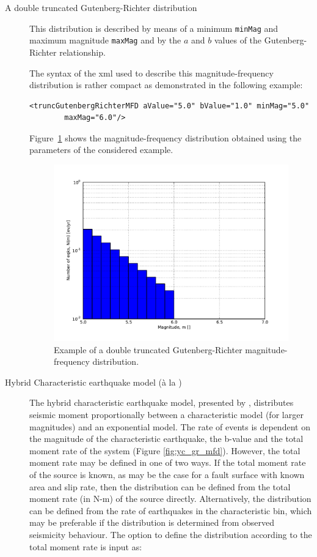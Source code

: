 \begin{description}
\item[A double truncated Gutenberg-Richter distribution]

This distribution is described by means of a minimum \texttt{minMag} and
maximum magnitude \texttt{maxMag} and by the $a$ and $b$ values of the
Gutenberg-Richter relationship.

The syntax of the xml used to describe this magnitude-frequency distribution
is rather compact as demonstrated in the following example:

\begin{Verbatim}[frame=single, commandchars=\\\{\}, fontsize=\footnotesize]
<truncGutenbergRichterMFD aValue="5.0" bValue="1.0" minMag="5.0"
        maxMag="6.0"/>
\end{Verbatim}

Figure~\ref{fig:dt_gr_mfd} shows the magnitude-frequency distribution
obtained using the parameters of the considered example.

\begin{figure}[!ht]
\centering
\includegraphics[width=12cm]{figures/hazard/dt_mfd.pdf}
\caption{Example of a double truncated Gutenberg-Richter magnitude-frequency
distribution.}
\label{fig:dt_gr_mfd}
\end{figure}

\item[Hybrid Characteristic earthquake model (\`{a} la \cite{youngs1985})]
The hybrid characteristic earthquake model, presented by \cite{youngs1985}, distributes seismic moment proportionally between a characteristic model (for larger magnitudes) and an exponential model. The rate of events is dependent on the magnitude of the characteristic earthquake, the b-value and the total moment rate of the system (Figure \ref{fig:yc_gr_mfd}). However, the total moment rate may be defined in one of two ways. If the total moment rate of the source is known, as may be the case for a fault surface with known area and slip rate, then the distribution can be defined from the total moment rate (in N-m) of the source directly. Alternatively, the distribution can be defined from the rate of earthquakes in the characteristic bin, which may be preferable if the distribution is determined from observed seismicity behaviour. The option to define the distribution according to the total moment rate is input as:
 

\end{description}
